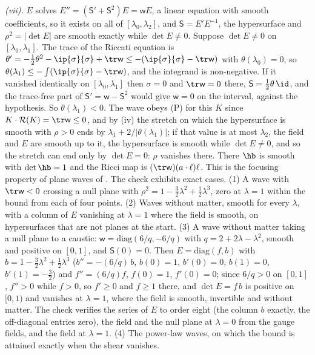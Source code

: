 \emph{(vii).} $E$ solves $E'' = (\mathsf{S}' + \mathsf{S}^{2})E = \mathsf{w}E$, a linear equation with smooth coefficients, so it exists on all of $[\lambda_{0}, \lambda_{2}]$, and $\mathsf{S} = E'E^{-1}$, the hypersurface and $\rho^{2} = |\det E|$ are smooth exactly while $\det E \neq 0$. Suppose $\det E \neq 0$ on $[\lambda_{0}, \lambda_{1}]$. The trace of the Riccati equation is $\theta' = -\tfrac12\theta^{2} - \ip{\sigma}{\sigma} + \tr\mathsf{w} \leq -(\ip{\sigma}{\sigma} - \tr\mathsf{w})$ with $\theta(\lambda_{0}) = 0$, so $\theta(\lambda_{1}) \leq -\int(\ip{\sigma}{\sigma} - \tr\mathsf{w})$, and the integrand is non-negative. If it vanished identically on $[\lambda_{0}, \lambda_{1}]$ then $\sigma = 0$ and $\tr\mathsf{w} = 0$ there, $\mathsf{S} = \tfrac12\theta\,\id$, and the trace-free part of $\mathsf{S}' = \mathsf{w} - \mathsf{S}^{2}$ would give $\mathsf{w} = 0$ on the interval, against the hypothesis. So $\theta(\lambda_{1}) < 0$. The wave obeys (P) for this $K$ since $K \cdot \mathcal{R}(K) = \tr\mathsf{w} \leq 0$, and by (iv) the stretch on which the hypersurface is smooth with $\rho > 0$ ends by $\lambda_{1} + 2/|\theta(\lambda_{1})|$; if that value is at most $\lambda_{2}$, the field and $E$ are smooth up to it, the hypersurface is smooth while $\det E \neq 0$, and so the stretch can end only by $\det E = 0$: $\rho$ vanishes there. There $\hb$ is smooth with $\det\hb = 1$ and the Ricci map is $(\tr\mathsf{w})(a \cdot \ell)\ell$. This is the focusing property of plane waves of \cite{Penrose1965}. The check exhibits exact cases. (1) A wave with $\tr\mathsf{w} < 0$ crossing a null plane with $\rho^{2} = 1 - \tfrac32\lambda^{2} + \tfrac12\lambda^{3}$, zero at $\lambda = 1$ within the bound from each of four points. (2) Waves without matter, smooth for every $\lambda$, with a column of $E$ vanishing at $\lambda = 1$ where the field is smooth, on hypersurfaces that are not planes at the start. (3) A wave without matter taking a null plane to a caustic: $\mathsf{w} = \mathrm{diag}(6/q, -6/q)$ with $q = 2 + 2\lambda - \lambda^{2}$, smooth and positive on $[0, 1]$, and $\mathsf{S}(0) = 0$. Then $E = \mathrm{diag}(f, b)$ with $b = 1 - \tfrac32\lambda^{2} + \tfrac12\lambda^{3}$ ($b'' = -(6/q)\,b$, $b(0) = 1$, $b'(0) = 0$, $b(1) = 0$, $b'(1) = -\tfrac32$) and $f'' = (6/q)f$, $f(0) = 1$, $f'(0) = 0$; since $6/q > 0$ on $[0, 1]$, $f'' > 0$ while $f > 0$, so $f' \geq 0$ and $f \geq 1$ there, and $\det E = f\,b$ is positive on $[0, 1)$ and vanishes at $\lambda = 1$, where the field is smooth, invertible and without matter. The check verifies the series of $E$ to order eight (the column $b$ exactly, the off-diagonal entries zero), the field and the null plane at $\lambda = 0$ from the gauge fields, and the field at $\lambda = 1$. (4) The power-law waves, on which the bound is attained exactly when the shear vanishes.

